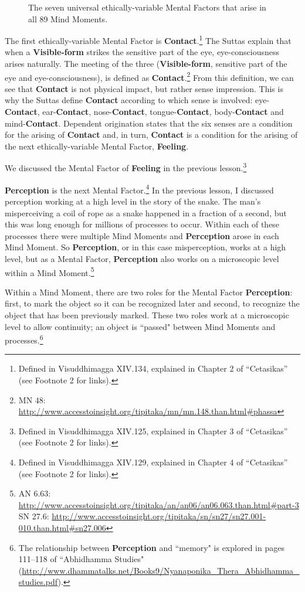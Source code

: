 \begin{figure} [H]
\caption{The seven universal ethically-variable Mental Factors that arise in all 89 Mind Moments.}
\label{VarUni}
\end{figure}

The first ethically-variable Mental Factor is \textbf{Contact}.\footnote{Defined in Visuddhimagga XIV.134, explained in Chapter 2 of “Cetasikas” (see Footnote 2 for links).} The Suttas explain that when a \textbf{Visible-form} strikes the sensitive part of the eye, eye-consciousness arises naturally. The meeting of the three (\textbf{Visible-form}, sensitive part of the eye and eye-consciousness), is defined as \textbf{Contact}.\footnote{MN 48: \url{http://www.accesstoinsight.org/tipitaka/mn/mn.148.than.html\#phassa}} From this definition, we can see that \textbf{Contact} is not physical impact, but rather sense impression. This is why the Suttas define \textbf{Contact} according to which sense is involved: eye-\textbf{Contact}, ear-\textbf{Contact}, nose-\textbf{Contact}, tongue-\textbf{Contact}, body-\textbf{Contact} and mind-\textbf{Contact}. Dependent origination states that the six senses are a condition for the arising of \textbf{Contact} and, in turn, \textbf{Contact} is a condition for the arising of the next ethically-variable Mental Factor, \textbf{Feeling}.

We discussed the Mental Factor of \textbf{Feeling} in the previous lesson.\footnote{Defined in Visuddhimagga XIV.125, explained in Chapter 3 of “Cetasikas” (see Footnote 2 for links).}

\pagebreak

\textbf{Perception} is the next Mental Factor.\footnote{Defined in Visuddhimagga XIV.129, explained in Chapter 4 of “Cetasikas” (see Footnote 2 for links).} In the previous lesson, I discussed perception working at a high level in the story of the snake. The man's misperceiving a coil of rope as a snake happened in a fraction of a second, but this was long enough for millions of processes to occur. Within each of these processes there were multiple Mind Moments and \textbf{Perception} arose in each Mind Moment. So \textbf{Perception}, or in this case misperception, works at a high level, but as a Mental Factor, \textbf{Perception} also works on a microscopic level within a Mind Moment.\footnote{AN 6.63: \url{http://www.accesstoinsight.org/tipitaka/an/an06/an06.063.than.html\#part-3}\\SN 27.6: \url{http://www.accesstoinsight.org/tipitaka/sn/sn27/sn27.001-010.than.html\#sn27.006}}

Within a Mind Moment, there are two roles for the Mental Factor \textbf{Perception}: first, to mark the object so it can be recognized later and second, to recognize the object that has been previously marked. These two roles work at a microscopic level to allow continuity; an object is ``passed" between Mind Moments and processes.\footnote{The relationship between \textbf{Perception} and “memory" is explored in pages 111--118 of “Abhidhamma Studies" (\url{http://www.dhammatalks.net/Books9/Nyanaponika_Thera_Abhidhamma_studies.pdf}).}

